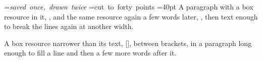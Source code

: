 \documentclass{article}
\begin{document}
=\hbox{\itshape saved once, drawn twice}
\edef\twice{\the\lastsavedboxresourceindex}
=\hbox{cut to forty points}
=40pt
\edef\cut{\the\lastsavedboxresourceindex}
A paragraph with a box resource in it, \useboxresource\twice, and the same
resource again a few words later, \useboxresource\twice, then text enough
to break the lines again at another width.

A box resource narrower than its text, [\useboxresource\cut], between
brackets, in a paragraph long enough to fill a line and then a few more
words after it.
\end{document}
